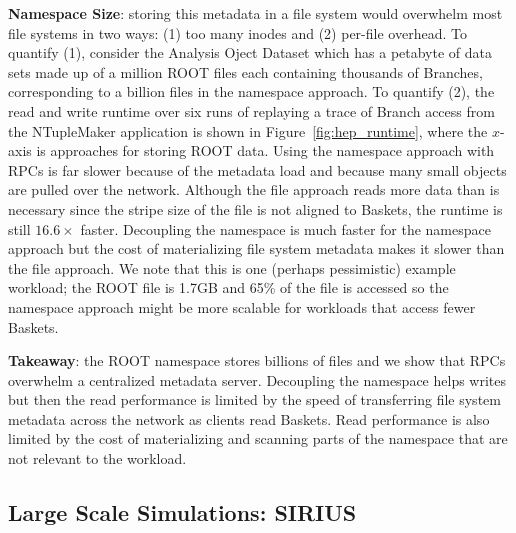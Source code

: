 \textbf{Namespace Size}: storing this metadata in a file system would overwhelm
most file systems in two ways: (1) too many inodes and (2) per-file overhead.
To quantify (1), consider the Analysis Oject Dataset which has a petabyte of
data sets made up of a million ROOT files each containing thousands of
Branches, corresponding to a billion files in the namespace approach.  To
quantify (2), the read and write runtime over six runs of replaying a trace of
Branch access from the NTupleMaker application is shown in
Figure~\ref{fig:hep_runtime}, where the \(x\)-axis is approaches for storing
ROOT data.  Using the namespace approach with RPCs is far slower because of the
metadata load and because many small objects are pulled over the network.
Although the file approach reads more data than is necessary since the stripe
size of the file is not aligned to Baskets, the runtime is still \(16.6\times\)
faster. Decoupling the namespace is much faster for the namespace approach but
the cost of materializing file system metadata makes it slower than the file
approach.  We note that this is one (perhaps pessimistic) example workload; the
ROOT file is 1.7GB and 65\% of the file is accessed so the namespace approach
might be more scalable for workloads that access fewer Baskets.


\textbf{Takeaway}: the ROOT namespace stores billions of files and we show that
RPCs overwhelm a centralized metadata server. Decoupling the namespace helps
writes but then the read performance is limited by the speed of transferring
file system metadata across the network as clients read Baskets.  Read
performance is also limited by the cost of materializing and scanning parts of
the namespace that are not relevant to the workload.

\subsection{Large Scale Simulations: SIRIUS}

